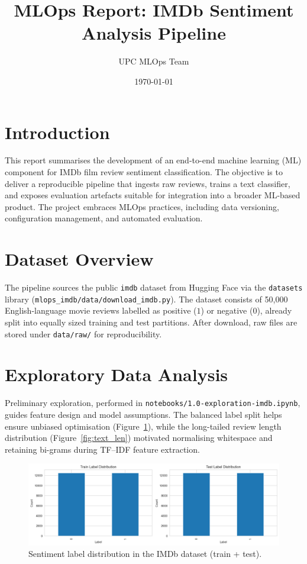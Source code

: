 \documentclass[11pt,a4paper]{article}
\title{MLOps Report: IMDb Sentiment Analysis Pipeline}
\author{UPC MLOps Team}
\date{\today}
\begin{document}
\maketitle

\section{Introduction}
This report summarises the development of an end-to-end machine learning (ML) component for IMDb film review sentiment classification. The objective is to deliver a reproducible pipeline that ingests raw reviews, trains a text classifier, and exposes evaluation artefacts suitable for integration into a broader ML-based product. The project embraces MLOps practices, including data versioning, configuration management, and automated evaluation.

\section{Dataset Overview}
The pipeline sources the public \texttt{imdb} dataset from Hugging Face via the \texttt{datasets} library (\texttt{mlops\_imdb/data/download\_imdb.py}). The dataset consists of 50{,}000 English-language movie reviews labelled as positive (\(1\)) or negative (\(0\)), already split into equally sized training and test partitions. After download, raw files are stored under \texttt{data/raw/} for reproducibility.

\section{Exploratory Data Analysis}
Preliminary exploration, performed in \texttt{notebooks/1.0-exploration-imdb.ipynb}, guides feature design and model assumptions. The balanced label split helps ensure unbiased optimisation (Figure~\ref{fig:label_dist}), while the long-tailed review length distribution (Figure~\ref{fig:text_len}) motivated normalising whitespace and retaining bi-grams during TF--IDF feature extraction.

\begin{figure}[h]
  \centering
  \includegraphics[width=1\textwidth]{label_distribution.png}
  \caption{Sentiment label distribution in the IMDb dataset (train + test).}
  \label{fig:label_dist}
\end{figure}
\end{document}
